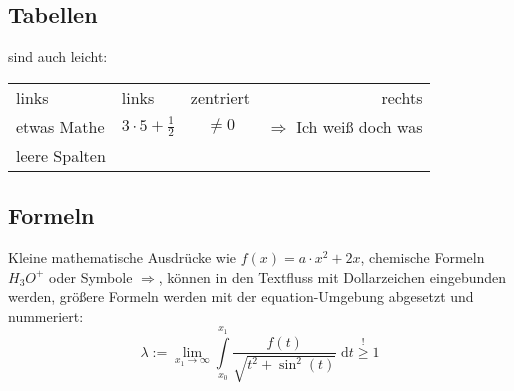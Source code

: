 	\subsection{Tabellen}
	sind auch leicht:\\
	\begin{tabular}{l||lc|r}				%
		links 			& links & zentriert 	& rechts\\		%
		etwas Mathe 	& $3 \cdot 5 + \frac{1}{2}$ & $\ne 0$ & $\Rightarrow$ Ich weiß doch was\\ \hline 	%
		leere Spalten 	& & & \\
	\end{tabular}


	\subsection{Formeln}
	Kleine mathematische Ausdrücke wie $f(x) = a \cdot x^2 + 2x$, chemische Formeln $H_3O^+$ oder Symbole $\Rightarrow$, können in den Textfluss 
	mit Dollarzeichen eingebunden werden, größere Formeln werden mit der equation-Umgebung abgesetzt und nummeriert:
	\begin{equation}
		\lambda := \lim\limits_{x_1 \rightarrow \infty}    \int\limits_{x_0}^{x_1} \frac{ f(t) }{ \sqrt{t^2 + \sin^2(t) } } \; \mathrm dt \stackrel{!}\ge 1
	\end{equation}
	
